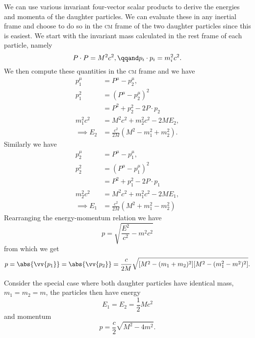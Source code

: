 \documentclass[fleqn]{NotesClass}
\newcommand{\CM}{\textsc{cm}}
\begin{document}
    We can use various invariant four-vector scalar products to derive the energies and momenta of the daughter particles.
    We can evaluate these in any inertial frame and choose to do so in the \CM{} frame of the two daughter particles since this is easiest.
    We start with the invariant mass calculated in the rest frame of each particle, namely
    \begin{equation}
        P\cdot P = M^2c^2, \qqand p_i\cdot p_i = m_i^2c^2.
    \end{equation}
    We then compute these quantities in the \CM{} frame and we have
    \begin{align}
        p_1^\mu &= P^\mu - p_2^\mu,\\
        p_1^2 &= (P^\mu - p_2^\mu)^2\\
        &= P^2 + p_2^2 - 2 P \cdot p_2\\
        m_1^2c^2 &= M^2c^2 + m_2^2c^2 - 2ME_2,\\
        \implies E_2 &= \frac{c^2}{2M}(M^2 - m_1^2 + m_2^2).
    \end{align}
    Similarly we have
    \begin{align}
        p_2^\mu &= P^\mu - p_1^\mu,\\
        p_2^2 &= (P^\mu - p_1^\mu)^2\\
        &= P^2 + p_1^2 - 2P\cdot p_1\\
        m_2^2c^2 &= M^2c^2 + m_1^2c^2 - 2ME_1,\\
        \implies E_1 &= \frac{c^2}{2M}(M^2 + m_1^2 - m_2^2)
    \end{align}
    Rearranging the energy-momentum relation we have
    \begin{equation}
        p = \sqrt{\frac{E^2}{c^2} - m^2c^2}
    \end{equation}
    from which we get
    \begin{equation}
        p = \abs{\vv{p_1}} = \abs{\vv{p_2}} = \frac{c}{2M}\sqrt{[M^2 - (m_1 + m_2)^2][M^2 - (m_1^2 - m^2)^2]}.
    \end{equation}
    
    Consider the special case where both daughter particles have identical mass, \(m_1 = m_2 = m\), the particles then have energy
    \begin{equation}
        E_1 = E_2 = \frac{1}{2}Mc^2
    \end{equation}
    and momentum
    \begin{equation}
        p = \frac{c}{2}\sqrt{M^2 - 4m^2}.
    \end{equation}
    
\end{document}
